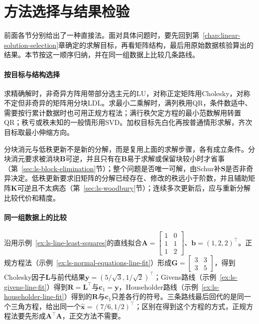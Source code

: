 \section{方法选择与结果检验}
\label{sec:ls-direct-method-comparison}

前面各节分别给出了一种直接法。面对具体问题时，要先回到第~\ref{chap:linear-solution-selection}章确定的求解目标，再看矩阵结构，最后用原始数据核验算出的结果。本节按这一顺序归纳，并在同一组数据上比较几条路线。

\paragraph{按目标与结构选择}
求精确解时，非奇异方阵用带部分选主元的LU，对称正定矩阵用Cholesky，对称不定但非奇异的矩阵用分块LDL。求最小二乘解时，满列秩用QR，条件数适中、需要按行累计数据时也可用正规方程法；满行秩欠定方程的最小范数解用转置QR；秩亏或秩未知的一般情形用SVD。加权目标先白化再按普通情形求解，齐次目标取最小伸缩方向。

分块消元与低秩更新不是新的分解，而是复用上面的求解步骤，各有成立条件。分块消元要求被消块$\bm B$可逆，并且只有在$\bm B$易于求解或保留块较小时才省事（第~\ref{sec:ls-block-elimination}节）；整个问题是否唯一可解，由Schur补$\bm S$是否非奇异决定。低秩更新要求旧矩阵的分解已经存在、修改的秩远小于阶数，并且辅助矩阵$\bm K$可逆且不太病态（第~\ref{sec:ls-woodbury}节）；连续多次更新后，应与重新分解比较代价和精度。

\paragraph{同一组数据上的比较}
沿用示例~\ref{ex:ls-line-least-squares}的直线拟合$\bm A=\left[\begin{smallmatrix}1&0\\1&1\\1&2\end{smallmatrix}\right]$、$\bm b=(1,2,2)^\top$。正规方程法（示例~\ref{ex:ls-normal-equations-line-fit}）形成$\bm G=\left[\begin{smallmatrix}3&3\\3&5\end{smallmatrix}\right]$，得到Cholesky因子$\bm L$与前代结果$\bm y=(5/\sqrt3,1/\sqrt2)^\top$；Givens路线（示例~\ref{ex:ls-givens-line-fit}）得到$\bm R=\bm L^\top$与$\bm c_1=\bm y$，Householder路线（示例~\ref{ex:ls-householder-line-fit}）得到的$\bm R$与$\bm c_1$只差各行的符号。三条路线最后回代的是同一个三角方程，给出同一个$\hat{\bm x}=(7/6,1/2)^\top$；区别在得到这个方程的方式，正规方程法要先形成$\bm A^\top\bm A$，正交方法不需要。


